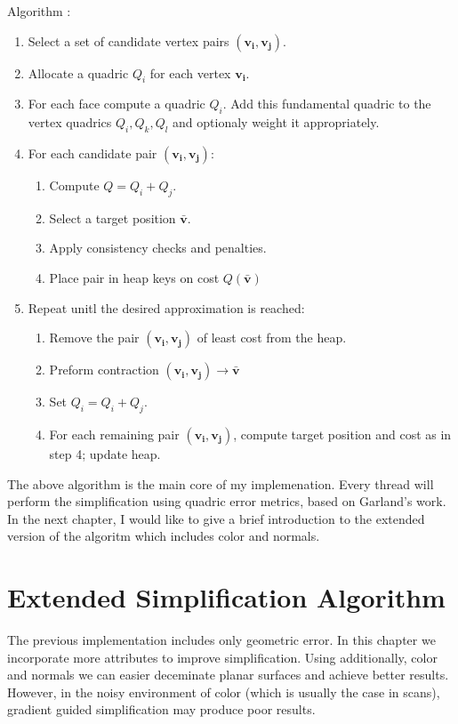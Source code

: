 Algorithm \cite{garland99}:

\begin{enumerate}
\item Select a set of candidate vertex pairs $(\mathbf{v_i}, \mathbf{v_j})$.
\item Allocate a quadric $Q_i$ for each vertex $\mathbf{v_i}$.
\item For each face compute a quadric $Q_i$. Add this fundamental quadric to the vertex quadrics $Q_i, Q_k, Q_l$ and optionaly weight it appropriately.
\item For each candidate pair $(\mathbf{v_i}, \mathbf{v_j})$:
\begin{enumerate}
\item Compute $Q = Q_i + Q_j$.
\item Select a target position $\mathbf{\bar{v}}$.
\item Apply consistency checks and penalties.
\item Place pair in heap keys on cost $Q(\mathbf{\bar{v}})$
\end{enumerate}
\item Repeat unitl the desired approximation is reached:
\begin{enumerate}
\item Remove the pair $(\mathbf{v_i}, \mathbf{v_j})$ of least cost from the heap.
\item Preform contraction $(\mathbf{v_i}, \mathbf{v_j})\rightarrow\bar{\mathbf{v}}$
\item Set $Q_i = Q_i + Q_j$.
\item For each remaining pair $(\mathbf{v_i}, \mathbf{v_j})$, compute target position and cost as in step 4; update heap.
\end{enumerate}
\end{enumerate}

The above algorithm is the main core of my implemenation. Every thread will perform the simplification using quadric error metrics, based on Garland's work. In the next chapter, I would like to give a brief introduction to the extended version of the algoritm which includes color and normals.

\chapter{Extended Simplification Algorithm}

The previous implementation includes only geometric error. In this chapter we incorporate more attributes to improve simplification. Using additionally, color and normals we can easier deceminate planar surfaces and achieve better results. However, in the noisy environment of color (which is usually the case in scans), gradient guided simplification may produce poor results.

